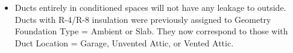\begin{itemize}
\item Ducts entirely in conditioned spaces will not have any leakage to outside. Ducts with R-4/R-8 insulation were previously assigned to Geometry Foundation Type = Ambient or Slab. They now correspond to those with Duct Location = Garage, Unvented Attic, or Vented Attic.
\end{itemize}
